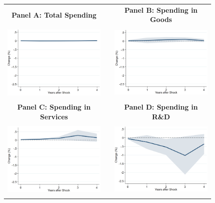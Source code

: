 \documentclass[dv_diss_main.tex]{subfiles}
\begin{document}
\begin{figure}[ht]
    \begin{center}
    \begin{tabular}[c]{ccc}
    
    \normalsize{\bf Panel A: Total Spending} & & \normalsize{\bf Panel B: Spending in Goods} \\
    {\includegraphics[height=1.5in,width=2.8in]{figures/graph_Rn_wages_lv_spill100_Rn_ms_lv_spill100.png}} & & {\includegraphics[height=1.5in,width=2.8in]{figures/graph_Rn_wages_lv_spill100_Rn_ms_goods_lv_spill100.png}} \\[0.1in]
    
    \normalsize{\bf Panel C: Spending in Services} & & \normalsize{\bf Panel D: Spending in R\&D} \\
    {\includegraphics[height=1.5in,width=2.8in]{figures/graph_Rn_wages_lv_spill100_Rn_ms_services_lv_spill100.png}} & & {\includegraphics[height=1.5in,width=2.8in]{figures/graph_Rn_wages_lv_spill100_Rn_ms_rd_lv_spill100.png}} \\[0.1in]
    

\end{tabular}
\end{center}
\end{figure}
\end{document}
